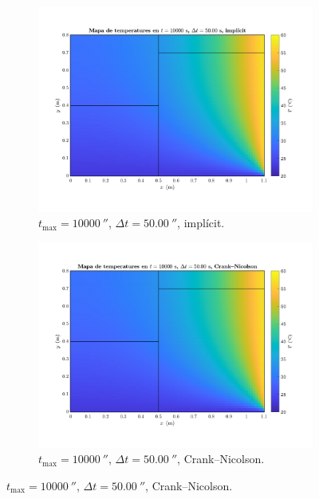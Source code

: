 \begin{figure}[ht]
\begin{subfigure}{.5\textwidth}
		\label{fig:esquema_8}
	\end{subfigure}
	\begin{subfigure}{.5\textwidth}
		\centering
		\includegraphics[width=.95\linewidth]{imagenes/04_analisi_influencia_dades_numeriques/esquema/esquema_9.pdf}
		\vspace{-15pt}
		\caption{$t_\text{max} = 10000 \ \second$, $\Delta t = 50.00 \ \second$, implícit.}
		\label{fig:esquema_9}
	\end{subfigure}%
	\begin{subfigure}{.5\textwidth}
		\centering
		\includegraphics[width=.95\linewidth]{imagenes/04_analisi_influencia_dades_numeriques/esquema/esquema_10.pdf}
		\vspace{-15pt}
		\caption{$t_\text{max} = 10000 \ \second$, $\Delta t = 50.00 \ \second$, Crank--Nicolson.}

\end{subfigure}
\end{figure}

